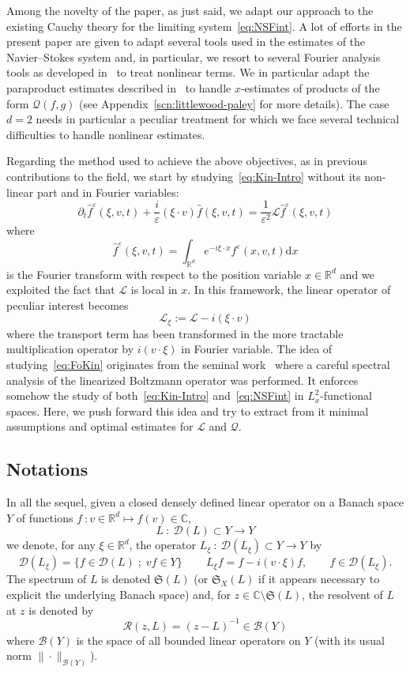 \documentclass[10pt]{amsart}
\theoremstyle{definition}\newtheorem{defi}[theo]{Definition}\newtheorem{rema}[theo]{Remark}\newtheorem{exam}[theo]{Example}\newtheorem{exem}[theo]{Example}\newtheorem{nota}[theo]{Notation}
\renewcommand{\d}{\mathrm{d}}
\newcommand{\R}{\mathbb{R}}
\newcommand{\C}{\mathbb{C}}
\newcommand{\fkS}{\mathfrak{S}}
\newcommand{\LL}{\mathcal{L}}
\newcommand{\QQ}{\mathcal{Q}}
\newcommand{\RR}{\mathcal{R}}
\newcommand{\dom}{\mathscr{D}}
\newcommand{\BBB}{\mathscr{B}}
\newcommand*\eps{{\varepsilon}}
\begin{document}
Among the novelty of the paper, as just said, we adapt our approach to the existing Cauchy theory for the limiting system~\eqref{eq:NSFint}. A lot of efforts in the present paper are given to adapt several tools used in the estimates of the Navier--Stokes system and, in particular, we resort to several Fourier analysis tools as developed in~\cite{BCD2011} to treat nonlinear terms. We in particular adapt the paraproduct estimates described in~\cite{BCD2011} to handle $x$-estimates of products of the form $\QQ(f,g)$ (see Appendix~\ref{scn:littlewood-paley} for more details). The case $d=2$ needs in particular a peculiar treatment for which we face several technical difficulties to handle nonlinear estimates.



Regarding the method used to achieve the above objectives, as in previous contributions to the field, we start by studying~\eqref{eq:Kin-Intro} without its non-linear part and in Fourier variables:
\begin{equation}\label{eq:FoKin}
\partial_{t}\widehat{f}^{\eps}(\xi,v,t)+\frac{i}{\eps}(\xi \cdot v)\widehat{f}(\xi,v,t)=\frac{1}{\eps^{2}}\LL \widehat{f}^{\eps}(\xi,v,t)
\end{equation}
where
\[
\widehat{f}^{\eps}(\xi,v,t)=\int_{\R^{d}}e^{-i \xi \cdot x}f^{\eps}(x,v,t)\d x
\]
is the Fourier transform with respect to the position variable $x\in \R^{d}$ and we exploited the fact that $\LL$ is local in $x.$ In this framework, the linear operator of peculiar interest becomes
\[
\LL_{\xi}:=\LL-i(\xi\cdot v)
\]
where the transport term has been transformed in the more tractable multiplication operator by $i(v\cdot \xi)$ in Fourier variable. The idea of studying~\eqref{eq:FoKin} originates from the seminal work~\cite{EP1975} where a careful spectral analysis of the linearized Boltzmann operator was performed. It enforces somehow the study of both~\eqref{eq:Kin-Intro} and~\eqref{eq:NSFint} in $L^{2}_{x}$-functional spaces. Here, we push forward this idea and try to extract from it minimal assumptions and optimal estimates for $\LL$ and $\QQ$.

\subsection{Notations}

In all the sequel, given a closed densely defined linear operator on a Banach space $Y$ of functions $f\::v \in \R^{d} \mapsto f(v)\in \C$,
\[
L\::\:\dom(L) \subset Y \to Y
\]
we denote, for any $\xi \in \R^{d}$, the operator $L_{\xi}\::\:\dom(L_{\xi}) \subset Y \to Y$ by
\[
\dom(L_{\xi})=\{f \in \dom(L)\;;\; v f \in Y\}\, \qquad L_{\xi}f=f-i(v\cdot \xi)f, \qquad f \in \dom(L_{\xi}).
\]
The spectrum of $L$ is denoted $\fkS(L)$ (or $\fkS_X(L)$ if it appears necessary to explicit the underlying Banach space) and, for $z \in \C \setminus \fkS(L)$, the resolvent of $L$ at $z$ is denoted by
\[
\RR(z,L)=(z-L)^{-1} \in \BBB(Y)
\]
where $\BBB(Y)$ is the space of all bounded linear operators on $Y$ (with its usual norm $\|\cdot\|_{\BBB(Y)}$).
\end{document}

